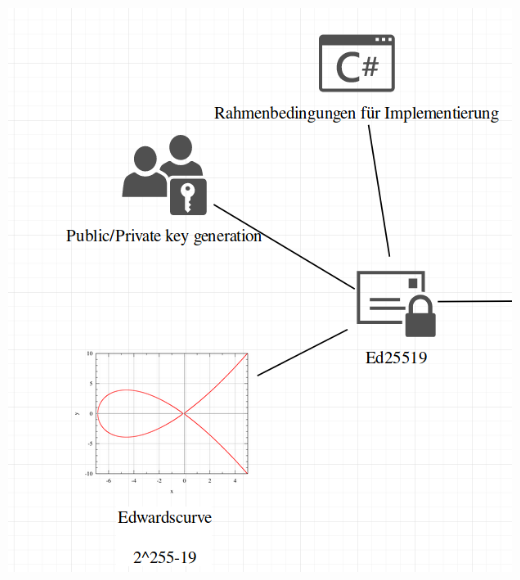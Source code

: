 \documentclass[
  10pt,
  ignorenonframetext,
  aspectratio=43,
]{beamer}
\begin{document}
\begin{frame}{}
\protect\hypertarget{section-1}{}
\includegraphics{Abbildungen/Punkt1.png}
\end{frame}
\end{document}
